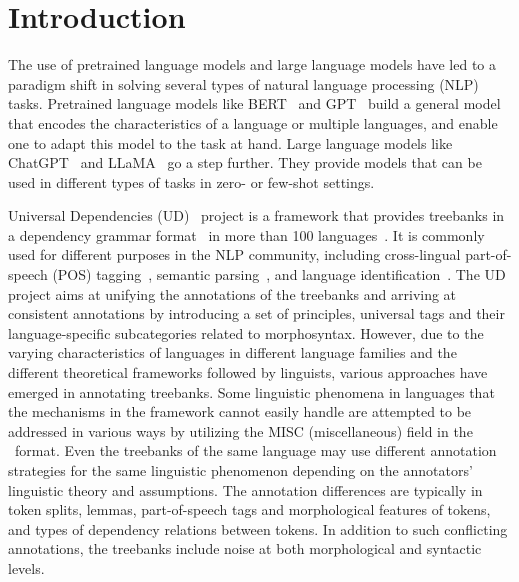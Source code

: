 \section{Introduction}
\label{sec:introduction}

The use of pretrained language models and large language models have led to a paradigm shift in solving several types of natural language processing (NLP) tasks. 
Pretrained language models like BERT~\cite{devlin-etal-2019-bert} and GPT~\cite{brown2020language} build a general model that encodes the characteristics of a language or multiple languages, and enable one to adapt this model to the task at hand. 
Large language models like ChatGPT~\cite{openai2021gpt35} and LLaMA~\cite{touvron2023llama} go a step further. 
They provide models that can be used in different types of tasks in zero- or few-shot settings.

Universal Dependencies (UD)~\cite{de2021universal} project is a framework that provides treebanks in a dependency grammar format~\cite{bauer1979some, debusmann2000introduction, de2019dependency} in more than 100 languages~. 
It is commonly used for different purposes in the NLP community, including cross-lingual part-of-speech (POS) tagging~\cite{parvez-chang-2021-evaluating}, semantic parsing~\cite{reddy-etal-2017-universal}, and language identification~\cite{toftrup-etal-2021-reproduction}. 
The UD project aims at unifying the annotations of the treebanks and arriving at consistent annotations by introducing a set of principles, universal tags and their language-specific subcategories related to morphosyntax. 
However, due to the varying characteristics of languages in different language families and the different theoretical frameworks followed by linguists, various approaches have emerged in annotating treebanks. 
Some linguistic phenomena in languages that the mechanisms in the framework cannot easily handle are attempted to be addressed in various ways by utilizing the MISC (miscellaneous) field in the \conllu\ format. 
Even the treebanks of the same language may use different annotation strategies for the same linguistic phenomenon depending on the annotators' linguistic theory and assumptions. 
The annotation differences are typically in token splits, lemmas, part-of-speech tags and morphological features of tokens, and types of dependency relations between tokens. 
In addition to such conflicting annotations, the treebanks include noise at both morphological and syntactic levels.

